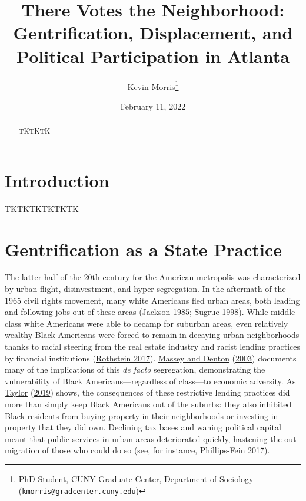 \documentclass[
  12pt,
]{article}
\title{There Votes the Neighborhood: Gentrification, Displacement, and Political Participation in Atlanta}
\author{Kevin Morris\footnote{PhD Student, CUNY Graduate Center, Department of Sociology (\href{mailto:kmorris@gradcenter.cuny.edu}{\nolinkurl{kmorris@gradcenter.cuny.edu}})}}
\date{February 11, 2022}
\begin{document}
\maketitle
\begin{abstract}
TKTKTK
\end{abstract}

\pagebreak

\doublespacing

\hypertarget{introduction}{%
\section*{Introduction}\label{introduction}}

TKTKTKTKTKTK

\hypertarget{gentrification-as-a-state-practice}{%
\section*{Gentrification as a State Practice}\label{gentrification-as-a-state-practice}}

The latter half of the 20th century for the American metropolis was characterized by urban flight, disinvestment, and hyper-segregation. In the aftermath of the 1965 civil rights movement, many white Americans fled urban areas, both leading and following jobs out of these areas (\protect\hyperlink{ref-Jackson1985}{Jackson 1985}; \protect\hyperlink{ref-Sugrue1998}{Sugrue 1998}). While middle class white Americans were able to decamp for suburban areas, even relatively wealthy Black Americans were forced to remain in decaying urban neighborhoods thanks to racial steering from the real estate industry and racist lending practices by financial institutions (\protect\hyperlink{ref-Rothstein2017}{Rothstein 2017}). \protect\hyperlink{ref-Massey2003}{Massey and Denton} (\protect\hyperlink{ref-Massey2003}{2003}) documents many of the implications of this \emph{de facto} segregation, demonstrating the vulnerability of Black Americans---regardless of class---to economic adversity. As \protect\hyperlink{ref-Taylor2019}{Taylor} (\protect\hyperlink{ref-Taylor2019}{2019}) shows, the consequences of these restrictive lending practices did more than simply keep Black Americans out of the suburbs: they also inhibited Black residents from buying property in their neighborhoods or investing in property that they did own. Declining tax bases and waning political capital meant that public services in urban areas deteriorated quickly, hastening the out migration of those who could do so (see, for instance, \protect\hyperlink{ref-Phillips-Fein2017}{Phillips-Fein 2017}).
\end{document}
